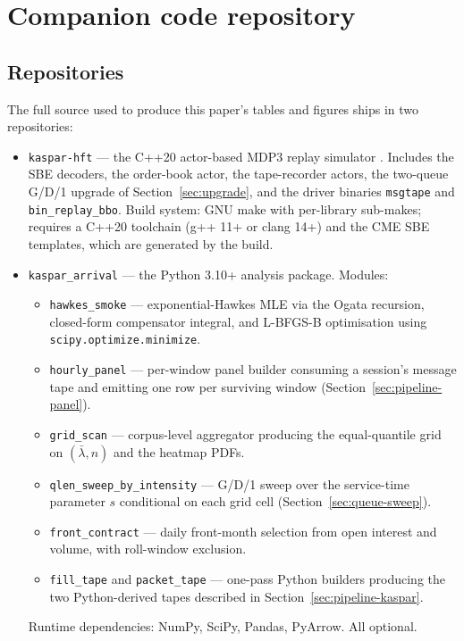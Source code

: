 \documentclass[11pt]{article}
\begin{document}
\section{Companion code repository}
\label{app:code}

\subsection*{Repositories}

The full source used to produce this paper's tables and figures ships in two repositories:

\begin{itemize}
    \item \texttt{kaspar-hft} --- the C++20 actor-based MDP3 replay simulator \citep{mayeski_actorhft}. Includes the SBE decoders, the order-book actor, the tape-recorder actors, the two-queue G/D/1 upgrade of Section~\ref{sec:upgrade}, and the driver binaries \texttt{msgtape} and \texttt{bin\_replay\_bbo}. Build system: GNU make with per-library sub-makes; requires a C++20 toolchain (g++ 11+ or clang 14+) and the CME SBE templates, which are generated by the build.
    \item \texttt{kaspar\_arrival} --- the Python 3.10+ analysis package. Modules:
    \begin{itemize}
        \item \texttt{hawkes\_smoke} --- exponential-Hawkes MLE via the Ogata recursion, closed-form compensator integral, and L-BFGS-B optimisation using \texttt{scipy.optimize.minimize}.
        \item \texttt{hourly\_panel} --- per-window panel builder consuming a session's message tape and emitting one row per surviving window (Section~\ref{sec:pipeline-panel}).
        \item \texttt{grid\_scan} --- corpus-level aggregator producing the equal-quantile grid on $(\bar\lambda, n)$ and the heatmap PDFs.
        \item \texttt{qlen\_sweep\_by\_intensity} --- G/D/1 sweep over the service-time parameter $s$ conditional on each grid cell (Section~\ref{sec:queue-sweep}).
        \item \texttt{front\_contract} --- daily front-month selection from open interest and volume, with roll-window exclusion.
        \item \texttt{fill\_tape} and \texttt{packet\_tape} --- one-pass Python builders producing the two Python-derived tapes described in Section~\ref{sec:pipeline-kaspar}.
    \end{itemize}
    Runtime dependencies: NumPy, SciPy, Pandas, PyArrow. All optional.
\end{itemize}
\end{document}
